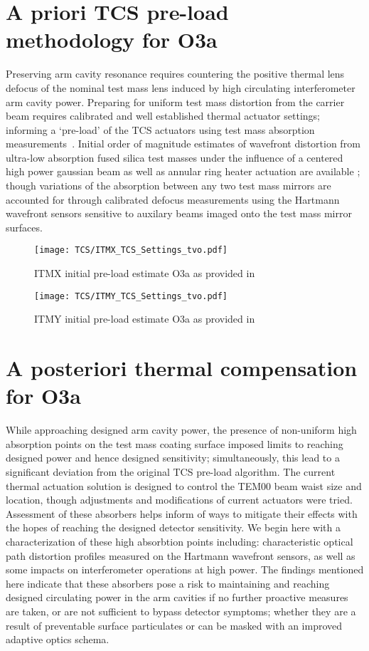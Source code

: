 \section{A priori TCS pre-load methodology for O3a}\label{sec:tvopreload}
Preserving arm cavity resonance requires countering the positive thermal lens defocus of the nominal test mass lens induced by high circulating interferometer arm cavity power. Preparing for uniform test mass distortion from the carrier beam requires calibrated and well established thermal actuator settings; informing a `pre-load' of the TCS actuators using test mass absorption measurements~\cite{Hamedan:2018}. Initial order of magnitude estimates of wavefront distortion from ultra-low absorption fused silica test masses under the influence of a centered high power gaussian beam as well as annular ring heater actuation are available \cite{hellovinet:1990, ramette:2016}; though variations of the absorption between any two test mass mirrors are accounted for through calibrated defocus measurements using the Hartmann wavefront sensors sensitive to auxilary beams imaged onto the test mass mirror surfaces. 

\begin{figure}[h]
  \centering
  \texttt{[image: TCS/ITMX\_TCS\_Settings\_tvo.pdf]}
  \hfill
  \caption{ITMX initial pre-load estimate O3a as provided in \cite{tvo}} 
  \label{fig:O3_ITMX_preload_tvo}
\end{figure}

\begin{figure}[H]
  \centering
  \texttt{[image: TCS/ITMY\_TCS\_Settings\_tvo.pdf]}
  \hfill
  \caption{ITMY initial pre-load estimate O3a as provided in \cite{tvo}} 
  \label{fig:O3_ITMY_preload_tvo}
\end{figure}

\section{A posteriori thermal compensation for O3a}
While approaching designed arm cavity power, the presence of non-uniform high absorption points on the test mass coating surface imposed limits to reaching designed power and hence designed sensitivity; simultaneously, this lead to a significant deviation from the original TCS pre-load algorithm. The current thermal actuation solution is designed to control the TEM00 beam waist size and location, though adjustments and modifications of current actuators were tried. Assessment of these absorbers helps inform of ways to mitigate their effects with the hopes of reaching the designed detector sensitivity. We begin here with a characterization of these high absorbtion points including: characteristic optical path distortion profiles measured on the Hartmann wavefront sensors, as well as some impacts on interferometer operations at high power. The findings mentioned here indicate that these absorbers pose a risk to maintaining and reaching designed circulating power in the arm cavities if no further proactive measures are taken, or are not sufficient to bypass detector symptoms; whether they are a result of preventable surface particulates or can be masked with an improved adaptive optics schema.  

